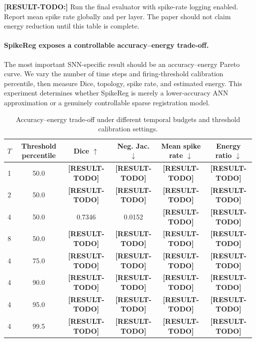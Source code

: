 \textbf{[RESULT-TODO:]} Run the final evaluator with spike-rate logging enabled. Report mean spike rate globally and per layer. The paper should not claim energy reduction until this table is complete.


\paragraph{SpikeReg exposes a controllable accuracy--energy trade-off.}
The most important SNN-specific result should be an accuracy--energy Pareto curve. We vary the number of time steps and firing-threshold calibration percentile, then measure Dice, topology, spike rate, and estimated energy. This experiment determines whether SpikeReg is merely a lower-accuracy ANN approximation or a genuinely controllable sparse registration model.

\begin{table}[t]
\centering
\caption{
Accuracy--energy trade-off under different temporal budgets and threshold calibration settings.
}
\label{tab:pareto}
\begin{tabular}{cccccc}
\hline
$T$ & Threshold percentile & Dice $\uparrow$ & Neg. Jac. $\downarrow$ & Mean spike rate $\downarrow$ & Energy ratio $\downarrow$ \\
\hline
1 & 50.0 & \textbf{[RESULT-TODO]} & \textbf{[RESULT-TODO]} & \textbf{[RESULT-TODO]} & \textbf{[RESULT-TODO]} \\
2 & 50.0 & \textbf{[RESULT-TODO]} & \textbf{[RESULT-TODO]} & \textbf{[RESULT-TODO]} & \textbf{[RESULT-TODO]} \\
4 & 50.0 & 0.7346 & 0.0152 & \textbf{[RESULT-TODO]} & \textbf{[RESULT-TODO]} \\
8 & 50.0 & \textbf{[RESULT-TODO]} & \textbf{[RESULT-TODO]} & \textbf{[RESULT-TODO]} & \textbf{[RESULT-TODO]} \\
\hline
4 & 75.0 & \textbf{[RESULT-TODO]} & \textbf{[RESULT-TODO]} & \textbf{[RESULT-TODO]} & \textbf{[RESULT-TODO]} \\
4 & 90.0 & \textbf{[RESULT-TODO]} & \textbf{[RESULT-TODO]} & \textbf{[RESULT-TODO]} & \textbf{[RESULT-TODO]} \\
4 & 95.0 & \textbf{[RESULT-TODO]} & \textbf{[RESULT-TODO]} & \textbf{[RESULT-TODO]} & \textbf{[RESULT-TODO]} \\
4 & 99.5 & \textbf{[RESULT-TODO]} & \textbf{[RESULT-TODO]} & \textbf{[RESULT-TODO]} & \textbf{[RESULT-TODO]} \\
\hline
\end{tabular}
\end{table}


